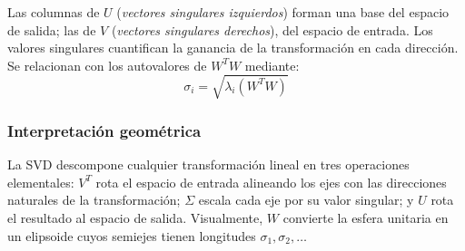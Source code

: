 Las columnas de $U$ (\emph{vectores singulares izquierdos}) forman una base del
espacio de salida; las de $V$ (\emph{vectores singulares derechos}), del espacio de
entrada. Los valores singulares cuantifican la ganancia de la transformación en
cada dirección. Se relacionan con los autovalores de $W^T W$ mediante:
\begin{equation}
    \sigma_i = \sqrt{\lambda_i(W^T W)}
    \label{eq:svd-eigenvalues}
\end{equation}

\subsubsection{Interpretación geométrica}
\label{sec:sota-svd-geometria}

La SVD descompone cualquier transformación lineal en tres operaciones elementales:
$V^T$ rota el espacio de entrada alineando los ejes con las direcciones naturales
de la transformación; $\Sigma$ escala cada eje por su valor singular; y $U$ rota
el resultado al espacio de salida. Visualmente, $W$ convierte la esfera unitaria
en un elipsoide cuyos semiejes tienen longitudes $\sigma_1, \sigma_2, \ldots$

